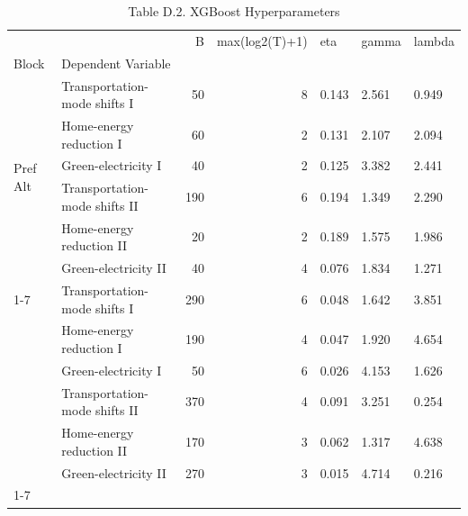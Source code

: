 \begin{table}
\caption{Table D.2. XGBoost Hyperparameters}
\begin{tabular}{llrrlll}
\toprule
 &  & B & max(log2(T)+1) & eta & gamma & lambda \\
Block & Dependent Variable &  &  &  &  &  \\
\midrule
\multirow[t]{6}{*}{Pref Alt} & Transportation-mode shifts I & 50 & 8 & 0.143 & 2.561 & 0.949 \\
 & Home-energy reduction I & 60 & 2 & 0.131 & 2.107 & 2.094 \\
 & Green-electricity I & 40 & 2 & 0.125 & 3.382 & 2.441 \\
 & Transportation-mode shifts II & 190 & 6 & 0.194 & 1.349 & 2.290 \\
 & Home-energy reduction II & 20 & 2 & 0.189 & 1.575 & 1.986 \\
 & Green-electricity II & 40 & 4 & 0.076 & 1.834 & 1.271 \\
\cline{1-7}
\multirow[t]{6}{*}{WTA} & Transportation-mode shifts I & 290 & 6 & 0.048 & 1.642 & 3.851 \\
 & Home-energy reduction I & 190 & 4 & 0.047 & 1.920 & 4.654 \\
 & Green-electricity I & 50 & 6 & 0.026 & 4.153 & 1.626 \\
 & Transportation-mode shifts II & 370 & 4 & 0.091 & 3.251 & 0.254 \\
 & Home-energy reduction II & 170 & 3 & 0.062 & 1.317 & 4.638 \\
 & Green-electricity II & 270 & 3 & 0.015 & 4.714 & 0.216 \\
\cline{1-7}
\bottomrule
\end{tabular}
\end{table}
